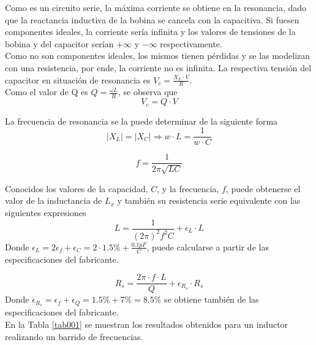 \documentclass[a4paper,10pt]{article}
\begin{document}
		\indent Como es un circuito serie, la máxima corriente se obtiene en 
		la resonancia, dado que la reactancia inductiva de la bobina se 
		cancela con la capacitiva. Si fuesen componentes ideales, la corriente
		sería infinita y los valores de tensiones de la bobina y del capacitor
		serían $+\infty$ y $-\infty$ respectivamente. \\
		\indent Como no son componentes ideales, los mismos tienen pérdidas y
		se las modelizan con una resistencia, por ende, la corriente no es 
		infinita. La respectiva tensión del capacitor en situación de 
		resonancia es $V_c = \frac{X_L\cdot V}{R}$. \\
		\indent Como el valor de Q es $Q=\frac{\omega L}{R}$, se observa que 
		$$V_c = Q \cdot V$$

		\indent La frecuencia de resonancia se la puede determinar de la 
		siguiente forma
		$$|X_L|=|X_C| \Rightarrow w\cdot L = \frac{1}{w\cdot C}$$

		$$f=\frac{1}{2\pi\sqrt{LC}}$$ 
		
		\indent Conocidos los valores de la capacidad, $C$, y la frecuencia, 
		$f$, puede obtenerse el valor de la inductancia de $L_x$ y tambi\'en 
		su resistencia serie equivalente con las siguientes expresiones
		$$L=\frac{1}{(2\pi)^2 f^2C}+\epsilon_L\cdot L$$
		Donde $\epsilon_L=2\epsilon_f+\epsilon_C=2\cdot 1.5\%+\frac{0.1pF}{C}$, 
		puede calcularse a partir de las especificaciones del  fabricante.
		
		$$R_s=\frac{2\pi\cdot f\cdot L}{Q}+\epsilon_{R_s}\cdot R_s$$
		Donde $\epsilon_{R_s}=\epsilon_f+\epsilon_Q= 1.5\%+ 7\%=8.5\%$ se 
		obtiene tambi\'en de las especificaciones del fabricante.
		\\
		\indent En la Tabla \ref{tab001} se muestran los resultados obtenidos
		para un inductor realizando un barrido de frecuencias.
		
\end{document}
